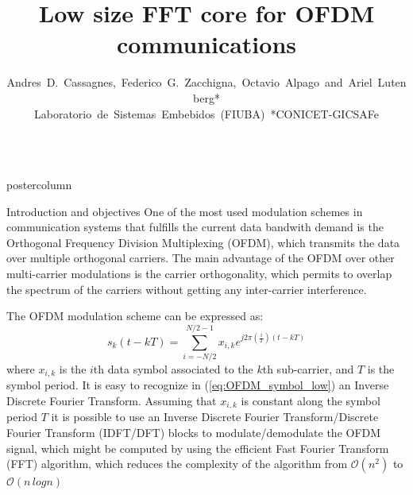 \documentclass[final]{beamer}
\title{Low size FFT core for OFDM communications}
\author{
   Andres~D.~Cassagnes{\small*},~Federico~G.~Zacchigna{\small*},~Octavio~Alpago{\small*}~and~Ariel~Lutenberg{\small* \small**}\\
   {\small *Laboratorio~de~Sistemas~Embebidos~(FIUBA)~\small **CONICET-GICSAFe}}
\begin{document}
\begin{frame}{}
\begin{columns}




\begin{column}{.5\textwidth}
   \begin{beamercolorbox}[center,wd=0.9\textwidth]{postercolumn}
      \begin{minipage}[T]{.99\textwidth}
      \parbox[t][105cm]{\textwidth}{

        \begin{block}{Introduction and objectives}
          \justify
          One of the most used modulation schemes in communication systems that fulfills the current data bandwith demand is the 
          Orthogonal Frequency Division Multiplexing (OFDM), which transmits the data  over multiple orthogonal carriers.
          The main advantage of the OFDM over other multi-carrier modulations is the carrier orthogonality, which permits to overlap 
          the spectrum of the carriers without getting any inter-carrier interference.
          
          The OFDM modulation scheme can be expressed as:
			\begin{equation}
			s_{k}(t-kT) =
				\sum\limits_{i=-N/2}^{N/2-1} x_{i,k} e^{j2\pi
				\left(\frac{i}{T}\right)(t-kT)}
			\label{eq:OFDM_symbol_low}
			\end{equation}
			where $x_{i,k}$ is the $i$th data symbol associated to the $k$th sub-carrier, and $T$ is the symbol period.
			It is easy to recognize in (\ref{eq:OFDM_symbol_low}) an Inverse Discrete Fourier Transform. 
			Assuming that $x_{i,k}$ is constant along the symbol period $T$ it is possible to use an Inverse Discrete Fourier Transform\slash Discrete Fourier Transform
			(IDFT\slash DFT) blocks to modulate\slash demodulate the OFDM signal, which might be computed by using the efficient Fast Fourier Transform (FFT) algorithm, 
			which reduces the complexity of the algorithm from $\mathcal{O}(n^2)$ to $\mathcal{O}(n \, log n)$
			

\end{block}}
\end{minipage}
\end{beamercolorbox}
\end{column}
\end{columns}
\end{frame}
\end{document}

